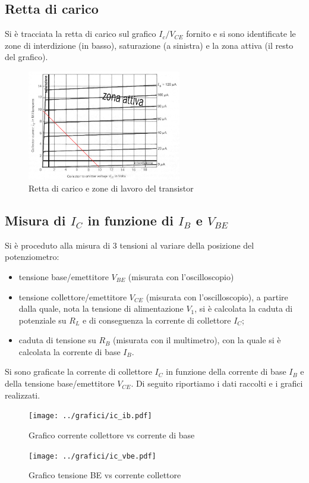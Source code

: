 \documentclass[10pt,a4paper]{article}
\begin{document}
\subsection{Retta di carico}
Si è tracciata la retta di carico sul grafico $I_c/V_{CE}$ fornito e si sono identificate le zone di interdizione (in basso), saturazione (a sinistra) e la zona attiva (il resto del grafico).
\begin{figure}[h]
	\centering
	\includegraphics[width=0.6\textwidth]{../grafici/retta_carico.png}
	\caption{Retta di carico e zone di lavoro del transistor}
	\label{retta_carico}
\end{figure}
\subsection{Misura di $I_C$ in funzione di $I_B$ e $V_{BE}$}
Si è proceduto alla misura di 3 tensioni al variare della posizione del potenziometro:
\begin{itemize}
	\item tensione base/emettitore $V_{BE}$ (misurata con l'oscilloscopio)
	\item tensione collettore/emettitore $V_{CE}$ (misurata con l'oscilloscopio), a partire dalla quale, nota la tensione di alimentazione $V_1$, si è calcolata la caduta di potenziale su $R_L$ e di conseguenza la corrente di collettore $I_C$;
	\item caduta di tensione su $R_B$ (misurata con il multimetro), con la quale si è calcolata la corrente di base $I_B$.
\end{itemize}
Si sono graficate la corrente di collettore $I_C$ in funzione della corrente di base $I_B$ e della tensione base/emettitore $V_{CE}$.
Di seguito riportiamo i dati raccolti e i grafici realizzati.

\begin{figure}[h!]
	\centering
	\begin{minipage}[h!]{0.4\textwidth}
		\centering
		\resizebox{1\textwidth}{!}{
			}
	\end{minipage}
	\begin{minipage}[d]{0.59\textwidth}
		\centering
		\texttt{[image: ../grafici/ic\_ib.pdf]}
		\caption{Grafico corrente collettore vs corrente di base}
		\label{ibic}
		\centering
		\texttt{[image: ../grafici/ic\_vbe.pdf]}
		\caption{Grafico tensione BE vs corrente collettore}
		\label{vbeic}
		\end{minipage}
\end{figure}
\end{document}
